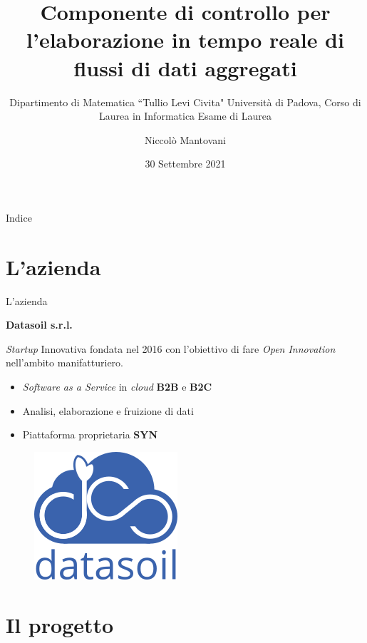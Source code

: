 \documentclass{beamer}
\title{Componente di controllo per l'elaborazione in tempo reale di flussi di dati aggregati}
\subtitle{Dipartimento di Matematica ``Tullio Levi Civita" Università di Padova, Corso di Laurea in Informatica Esame di Laurea}
\date{30 Settembre 2021}
\author{Niccolò Mantovani}
\begin{document}
	\maketitle

	\begin{frame}{Indice}
		\tableofcontents
	\end{frame}


	\section{L'azienda}

	\begin{frame}{L'azienda}

		\textbf{Datasoil s.r.l.} \vspace{.2em}
		
		\textit{Startup} Innovativa fondata nel 2016 con l'obiettivo di fare \textit{Open Innovation} nell'ambito manifatturiero. \vspace{.2em}
		
		\begin{itemize}
			\item \textit{Software as a Service} in \textit{cloud} \textbf{B2B} e \textbf{B2C} \vspace{.5em}
			\item Analisi, elaborazione e fruizione di dati \vspace{.5em}
			\item Piattaforma proprietaria \textbf{SYN}
		\end{itemize}
		
		\begin{figure}[!h] 
    		\centering 
    		\includegraphics[width=0.2\columnwidth]{../immagini/ds_logo.png}
		\end{figure}

	\end{frame}

	\section{Il progetto}
\end{document}
